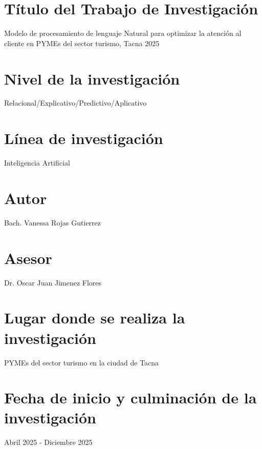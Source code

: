 
\section{Título del Trabajo de Investigación} 
Modelo de procesamiento de lenguaje Natural para optimizar la atención al cliente en PYMEs del sector turismo, Tacna 2025

\section{Nivel de la investigación}
Relacional/Explicativo/Predictivo/Aplicativo

\section{Línea de investigación}
Inteligencia Artificial

\section{Autor}
Bach. Vanessa Rojas Gutierrez

\section{Asesor}
Dr. Oscar Juan Jimenez Flores

\section{Lugar donde se realiza la investigación}
PYMEs del sector turismo en la ciudad de Tacna

\section{Fecha de inicio y culminación de la investigación}
Abril 2025 - Diciembre 2025